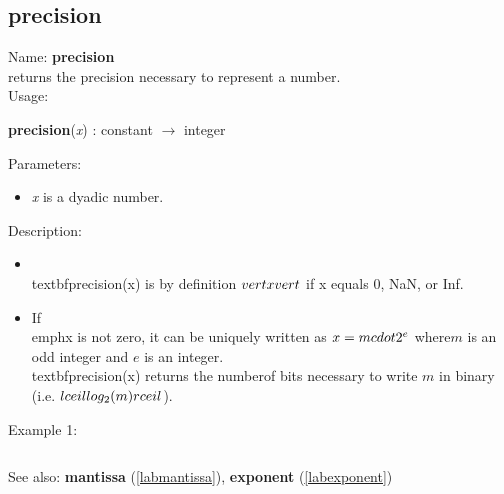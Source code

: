 \subsection{precision}
\label{labprecision}
\noindent Name: \textbf{precision}\\
returns the precision necessary to represent a number.\\
\noindent Usage: 
\begin{center}
\textbf{precision}(\emph{x}) : \textsf{constant} $\rightarrow$ \textsf{integer}\\
\end{center}
Parameters: 
\begin{itemize}
\item \emph{x} is a dyadic number.
\end{itemize}
\noindent Description: \begin{itemize}

\item \\textbf{precision}(x) is by definition $\\vert x \\vert$ if x equals 0, NaN, or Inf.\n
\item If \\emph{x} is not zero, it can be uniquely written as $x = m \\cdot 2^e$ where\n   $m$ is an odd integer and $e$ is an integer. \\textbf{precision}(x) returns the number\n   of bits necessary to write $m$ in binary (i.e. $\\lceil \\log_2(m) \\rceil$).\n\end{itemize}
\noindent Example 1: 
\begin{center}\begin{minipage}{15cm}\begin{Verbatim}[frame=single]
\end{Verbatim}
\end{minipage}\end{center}
See also: \textbf{mantissa} (\ref{labmantissa}), \textbf{exponent} (\ref{labexponent})

